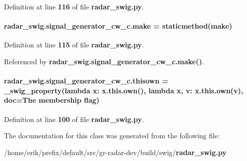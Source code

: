 Definition at line {\bf 116} of file {\bf radar\+\_\+swig.\+py}.

\paragraph[{make}]{\setlength{\rightskip}{0pt plus 5cm}radar\+\_\+swig.\+signal\+\_\+generator\+\_\+cw\+\_\+c.\+make = staticmethod(make)\hspace{0.3cm}{\ttfamily [static]}}\label{classradar__swig_1_1signal__generator__cw__c_a09cb7c62b30a81f64bedfde6dcb7fc13}


Definition at line {\bf 115} of file {\bf radar\+\_\+swig.\+py}.



Referenced by {\bf radar\+\_\+swig.\+signal\+\_\+generator\+\_\+cw\+\_\+c.\+make()}.

\paragraph[{thisown}]{\setlength{\rightskip}{0pt plus 5cm}radar\+\_\+swig.\+signal\+\_\+generator\+\_\+cw\+\_\+c.\+thisown = {\bf \+\_\+swig\+\_\+property}(lambda x\+: x.\+this.\+own(), lambda {\bf x}, v\+: x.\+this.\+own(v), doc=\textquotesingle{}The membership flag\textquotesingle{})\hspace{0.3cm}{\ttfamily [static]}}\label{classradar__swig_1_1signal__generator__cw__c_afb348a7c54587d5c765784c556cc1ee6}


Definition at line {\bf 100} of file {\bf radar\+\_\+swig.\+py}.



The documentation for this class was generated from the following file\+:\begin{DoxyCompactItemize}
\item 
/home/erik/prefix/default/src/gr-\/radar-\/dev/build/swig/{\bf radar\+\_\+swig.\+py}\end{DoxyCompactItemize}
